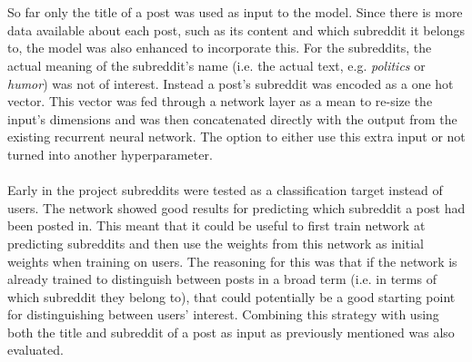 \\\\
So far only the title of a post was used as input to the model. Since there is more data available about each post, such as its content and which subreddit it belongs to, the model was also enhanced to incorporate this. For the subreddits, the actual meaning of the subreddit's name (i.e. the actual text, e.g. \textit{politics} or \textit{humor}) was not of interest. Instead a post's subreddit was encoded as a one hot vector. This vector was fed through a network layer as a mean to re-size the input's dimensions and was then concatenated directly with the output from the existing recurrent neural network. The option to either use this extra input or not turned into another hyperparameter.
\\\\
Early in the project subreddits were tested as a classification target instead of users. The network showed good results for predicting which subreddit a post had been posted in. This meant that it could be useful to first train network at predicting subreddits and then use the weights from this network as initial weights when training on users. The reasoning for this was that if the network is already trained to distinguish between posts in a broad term (i.e. in terms of which subreddit they belong to), that could potentially be a good starting point for distinguishing between users' interest. Combining this strategy with using both the title and subreddit of a post as input as previously mentioned was also evaluated.


